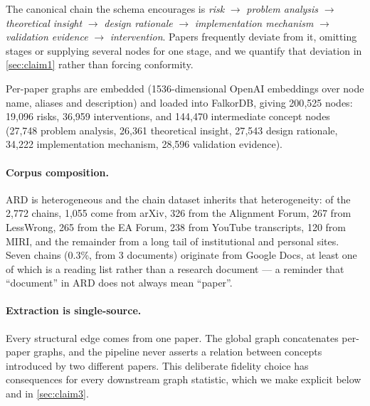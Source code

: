 \documentclass[10pt,twocolumn,letterpaper]{article}
\begin{document}
The canonical chain the schema encourages is
\emph{risk} $\rightarrow$ \emph{problem analysis} $\rightarrow$ \emph{theoretical
insight} $\rightarrow$ \emph{design rationale} $\rightarrow$ \emph{implementation
mechanism} $\rightarrow$ \emph{validation evidence} $\rightarrow$
\emph{intervention}. Papers frequently deviate from it, omitting stages or
supplying several nodes for one stage, and we quantify that deviation in
\cref{sec:claim1} rather than forcing conformity.

Per-paper graphs are embedded (1536-dimensional OpenAI embeddings over node name,
aliases and description) and loaded into FalkorDB, giving 200{,}525 nodes:
19{,}096 risks, 36{,}959 interventions, and 144{,}470 intermediate concept nodes
(27{,}748 problem analysis, 26{,}361 theoretical insight, 27{,}543 design
rationale, 34{,}222 implementation mechanism, 28{,}596 validation evidence).

\paragraph{Corpus composition.} ARD is heterogeneous and the chain dataset
inherits that heterogeneity: of the 2{,}772 chains, 1{,}055 come from arXiv, 326
from the Alignment Forum, 267 from LessWrong, 265 from the EA Forum, 238 from
YouTube transcripts, 120 from MIRI, and the remainder from a long tail of
institutional and personal sites. Seven chains (0.3\%, from 3 documents)
originate from Google Docs, at least one of which is a reading list rather than a
research document --- a reminder that ``document'' in ARD does not always mean
``paper''.

\paragraph{Extraction is single-source.} Every structural edge comes from one
paper. The global graph concatenates per-paper graphs, and the pipeline never
asserts a relation between concepts introduced by two different papers. This
deliberate fidelity choice has consequences for every downstream graph statistic,
which we make explicit below and in \cref{sec:claim3}.
\end{document}
